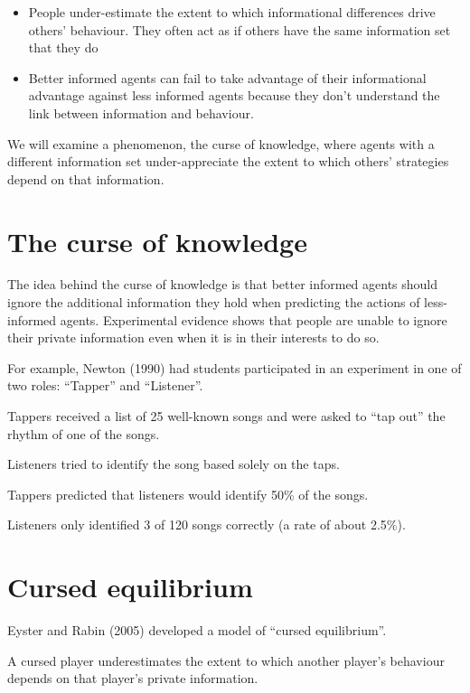 \documentclass[
  letterpaper,
  DIV=11,
  numbers=noendperiod]{scrreprt}
\begin{document}
\begin{itemize}
\item
  People under-estimate the extent to which informational differences
  drive others' behaviour. They often act as if others have the same
  information set that they do
\item
  Better informed agents can fail to take advantage of their
  informational advantage against less informed agents because they
  don't understand the link between information and behaviour.
\end{itemize}

We will examine a phenomenon, the curse of knowledge, where agents with
a different information set under-appreciate the extent to which others'
strategies depend on that information.

\hypertarget{the-curse-of-knowledge}{%
\section{The curse of knowledge}\label{the-curse-of-knowledge}}

The idea behind the curse of knowledge is that better informed agents
should ignore the additional information they hold when predicting the
actions of less-informed agents. Experimental evidence shows that people
are unable to ignore their private information even when it is in their
interests to do so.

For example, Newton (1990) had students participated in an experiment in
one of two roles: ``Tapper'' and ``Listener''.

Tappers received a list of 25 well-known songs and were asked to ``tap
out'' the rhythm of one of the songs.

Listeners tried to identify the song based solely on the taps.

Tappers predicted that listeners would identify 50\% of the songs.

Listeners only identified 3 of 120 songs correctly (a rate of about
2.5\%).

\hypertarget{cursed-equilibrium}{%
\section{Cursed equilibrium}\label{cursed-equilibrium}}

Eyster and Rabin (2005) developed a model of ``cursed equilibrium''.

A cursed player underestimates the extent to which another player's
behaviour depends on that player's private information.
\end{document}

